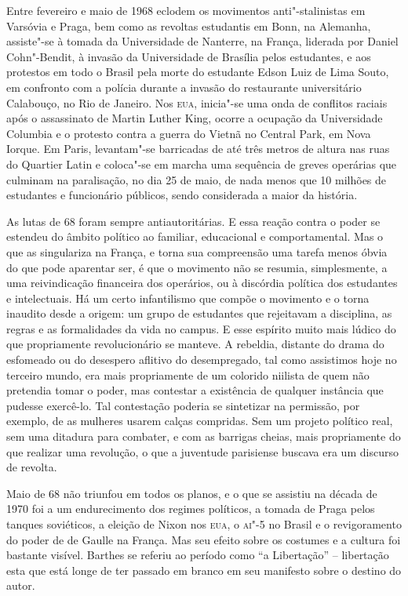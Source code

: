 Entre fevereiro e maio de 1968 eclodem os movimentos anti"-stalinistas em
Varsóvia e Praga, bem como as revoltas estudantis em Bonn, na Alemanha,
assiste"-se à tomada da Universidade de Nanterre, na França, liderada por
Daniel Cohn"-Bendit, à invasão da Universidade de Brasília pelos
estudantes, e aos protestos em todo o Brasil pela morte do estudante
Edson Luiz de Lima Souto, em confronto com a polícia durante a invasão
do restaurante universitário Calabouço, no Rio de Janeiro. Nos
\textsc{eua}, inicia"-se uma onda de conflitos raciais após o assassinato
de Martin Luther King, ocorre a ocupação da Universidade Columbia e o
protesto contra a guerra do Vietnã no Central Park, em Nova Iorque. Em
Paris, levantam"-se barricadas de até três metros de altura nas ruas do
Quartier Latin e coloca"-se em marcha uma sequência de greves operárias
que culminam na paralisação, no dia 25 de maio, de nada menos que 10
milhões de estudantes e funcionário públicos, sendo considerada a maior
da história.

As lutas de 68 foram sempre antiautoritárias. E essa reação contra o
poder se estendeu do âmbito político ao familiar, educacional e
comportamental. Mas o que as singulariza na França, e torna sua
compreensão uma tarefa menos óbvia do que pode aparentar ser, é que o
movimento não se resumia, simplesmente, a uma reivindicação financeira
dos operários, ou à discórdia política dos estudantes e intelectuais. Há
um certo infantilismo que compõe o movimento e o torna inaudito desde a
origem: um grupo de estudantes que rejeitavam a disciplina, as regras e
as formalidades da vida no campus. E esse espírito muito mais lúdico do
que propriamente revolucionário se manteve. A rebeldia, distante do
drama do esfomeado ou do desespero aflitivo do desempregado, tal como
assistimos hoje no terceiro mundo, era mais propriamente de um colorido
niilista de quem não pretendia tomar o poder, mas contestar a existência
de qualquer instância que pudesse exercê-lo. Tal contestação poderia se
sintetizar na permissão, por exemplo, de as mulheres usarem calças
compridas. Sem um projeto político real, sem uma ditadura para combater,
e com as barrigas cheias, mais propriamente do que realizar uma
revolução, o que a juventude parisiense buscava era um discurso de
revolta.

Maio de 68 não triunfou em todos os planos, e o que se assistiu na
década de 1970 foi a um endurecimento dos regimes políticos, a tomada de
Praga pelos tanques soviéticos, a eleição de Nixon nos \textsc{eua}, o
\textsc{ai"-5} no Brasil e o revigoramento do poder de de Gaulle na
França. Mas seu efeito sobre os costumes e a cultura foi bastante
visível. Barthes se referiu ao período como ``a Libertação'' --
libertação esta que está longe de ter passado em branco em seu manifesto
sobre o destino do autor.

